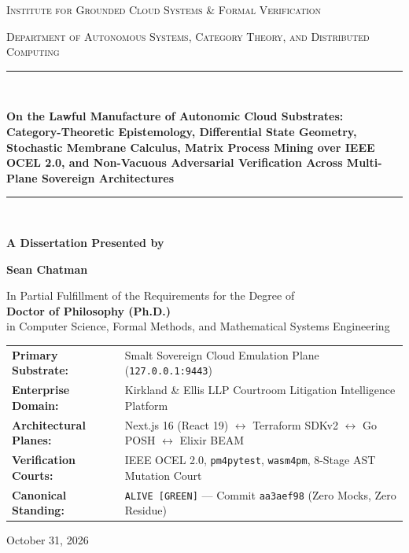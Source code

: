 \documentclass[10pt,twoside,openany]{book}
\theoremstyle{plain}
\theoremstyle{definition}
\theoremstyle{remark}
\begin{document}
\frontmatter

\begin{titlepage}
\centering
\vspace*{0.8cm}
{\scshape\Large Institute for Grounded Cloud Systems \& Formal Verification \par}
\vspace{0.3cm}
{\scshape\large Department of Autonomous Systems, Category Theory, and Distributed Computing \par}
\vspace{1.5cm}
\rule{\linewidth}{0.6mm} \\[0.4cm]
{\huge\bfseries On the Lawful Manufacture of Autonomic Cloud Substrates: \\[0.3cm]
\Large Category-Theoretic Epistemology, Differential State Geometry, Stochastic Membrane Calculus, Matrix Process Mining over IEEE OCEL 2.0, and Non-Vacuous Adversarial Verification Across Multi-Plane Sovereign Architectures \par}
\rule{\linewidth}{0.6mm} \\[1.2cm]

{\Large\bfseries A Dissertation Presented by \par}
\vspace{0.4cm}
{\huge\bfseries Sean Chatman \par}
\vspace{0.8cm}
{\large In Partial Fulfillment of the Requirements for the Degree of \\[0.2cm]
\textbf{Doctor of Philosophy (Ph.D.)} \\[0.2cm]
in Computer Science, Formal Methods, and Mathematical Systems Engineering \par}

\vfill

\begin{tabular}{ll}
\textbf{Primary Substrate:} & Smalt Sovereign Cloud Emulation Plane (\texttt{127.0.0.1:9443}) \\
\textbf{Enterprise Domain:} & Kirkland \& Ellis LLP Courtroom Litigation Intelligence Platform \\
\textbf{Architectural Planes:} & Next.js 16 (React 19) $\leftrightarrow$ Terraform SDKv2 $\leftrightarrow$ Go POSH $\leftrightarrow$ Elixir BEAM \\
\textbf{Verification Courts:} & IEEE OCEL 2.0, \texttt{pm4pytest}, \texttt{wasm4pm}, 8-Stage AST Mutation Court \\
\textbf{Canonical Standing:} & \texttt{ALIVE [GREEN]} --- Commit \texttt{aa3aef98} (Zero Mocks, Zero Residue)
\end{tabular}

\vspace{1.0cm}
{\large October 31, 2026 \par}
\end{titlepage}
\end{document}
